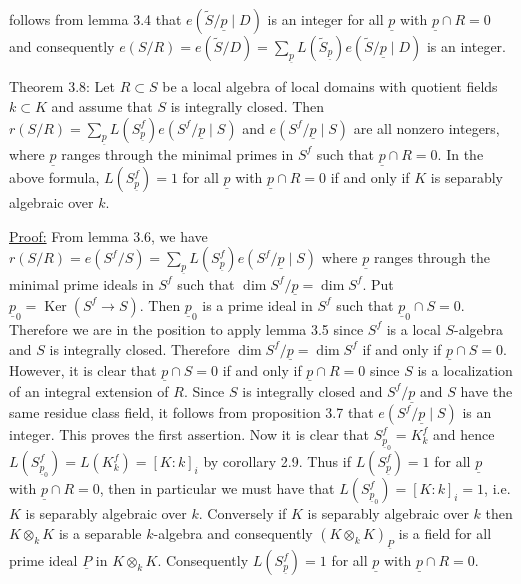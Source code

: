 follows from lemma 3.4 that $e(\widetilde S/\underline p\mid D)$ is an integer for all $\underline p$ with $\underline p\cap R=0$ and consequently $e(S/R)=e(\widetilde S/D)=\sum_{\underline p}L(\widetilde S_{\underline p})e(\widetilde S/\underline p\mid D)$ is an integer.

Theorem 3.8: Let $R\subset S$ be a local algebra of local domains with quotient fields $k\subset K$ and assume that $S$ is integrally closed. Then $r(S/R)=\sum_{\underline p}L(S_{\underline p}^f)e(S^f/\underline p\mid S)$ and $e(S^f/\underline p\mid S)$ are all nonzero integers, where $\underline p$ ranges through the minimal primes in $S^f$ such that $\underline p\cap R=0$. In the above formula, $L(S_{\underline p}^f)=1$ for all $\underline p$ with $\underline p\cap R=0$ if and only if $K$ is separably algebraic over $k$.

\uline{Proof:} From lemma 3.6, we have $r(S/R)=e(S^f/S)=\sum_{\underline p}L(S_{\underline p}^f)e(S^f/\underline p\mid S)$ where $\underline p$ ranges through the minimal prime ideals in $S^f$ such that $\dim S^f/\underline p=\dim S^f$. Put $\underline p_0=\operatorname{Ker}(S^f\longrightarrow S)$. Then $\underline p_0$ is a prime ideal in $S^f$ such that $\underline p_0\cap S=0$. Therefore we are in the position to apply lemma 3.5 since $S^f$ is a local $S$-algebra and $S$ is integrally closed. Therefore $\dim S^f/\underline p=\dim S^f$ if and only if $\underline p\cap S=0$. However, it is clear that $\underline p\cap S=0$ if and only if $\underline p\cap R=0$ since $S$ is a localization of an integral extension of $R$. Since $S$ is integrally closed and $S^f/\underline p$ and $S$ have the same residue class field, it follows from proposition 3.7 that $e(S^f/\underline p\mid S)$ is an integer. This proves the first assertion. Now it is clear that $S_{\underline p_0}^f=K_k^f$ and hence $L(S_{\underline p_0}^f)=L(K_k^f)=[K:k]_i$ by corollary 2.9. Thus if $L(S_{\underline p}^f)=1$ for all $\underline p$ with $\underline p\cap R=0$, then in particular we must have that $L(S_{\underline p_0}^f)=[K:k]_i=1$, i.e. $K$ is separably algebraic over $k$. Conversely if $K$ is separably algebraic over $k$ then $K\otimes_k K$ is a separable $k$-algebra and consequently $(K\otimes_k K)_{\underline P}$ is a field for all prime ideal $\underline P$ in $K\otimes_k K$. Consequently $L(S_{\underline p}^f)=1$ for all $\underline p$ with $\underline p\cap R=0$.
